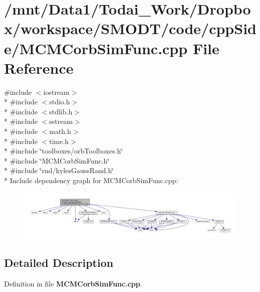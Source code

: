 \section{/mnt/\-Data1/\-Todai\-\_\-\-Work/\-Dropbox/workspace/\-S\-M\-O\-D\-T/code/cpp\-Side/\-M\-C\-M\-Corb\-Sim\-Func.cpp File Reference}
\label{_m_c_m_corb_sim_func_8cpp}
{\ttfamily \#include $<$iostream$>$}\\*
{\ttfamily \#include $<$stdio.\-h$>$}\\*
{\ttfamily \#include $<$stdlib.\-h$>$}\\*
{\ttfamily \#include $<$sstream$>$}\\*
{\ttfamily \#include $<$math.\-h$>$}\\*
{\ttfamily \#include $<$time.\-h$>$}\\*
{\ttfamily \#include \char`\"{}toolboxes/orb\-Toolboxes.\-h\char`\"{}}\\*
{\ttfamily \#include \char`\"{}M\-C\-M\-Corb\-Sim\-Func.\-h\char`\"{}}\\*
{\ttfamily \#include \char`\"{}rnd/kyles\-Gauss\-Rand.\-h\char`\"{}}\\*
Include dependency graph for M\-C\-M\-Corb\-Sim\-Func.\-cpp\-:\nopagebreak
\begin{figure}[H]
\begin{center}
\leavevmode
\includegraphics[width=350pt]{_m_c_m_corb_sim_func_8cpp__incl}
\end{center}
\end{figure}


\subsection{Detailed Description}


Definition in file {\bf M\-C\-M\-Corb\-Sim\-Func.\-cpp}.

